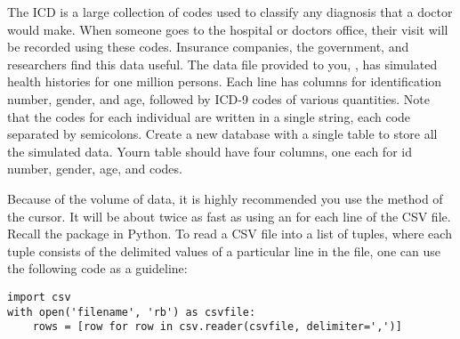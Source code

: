 \begin{problem}
The ICD is a large collection of codes used to classify any diagnosis that a doctor would make.
When someone goes to the hospital or doctors office, their visit will be recorded using these codes.
Insurance companies, the government, and researchers find this data useful.
The data file provided to you, , has simulated health histories for one million persons.
Each line has columns for identification number, gender, and age, followed by ICD-9 codes of various quantities.
Note that the codes for each individual are written in a single string, each code separated by semicolons.
Create a new database with a single table to store all the simulated data.
Yourn table should have four columns, one each for id number, gender, age, and codes.

Because of the volume of data, it is highly recommended you use the  method of the cursor.
It will be about twice as fast as using an  for each line of the CSV file.
Recall the  package in Python. To read a CSV file into a list of tuples, where each tuple consists
of the delimited values of a particular line in the file, one can use the following code as a guideline:
\begin{lstlisting}
import csv
with open('filename', 'rb') as csvfile:
    rows = [row for row in csv.reader(csvfile, delimiter=',')]
\end{lstlisting}
\label{prob:icd9tables}
\end{problem}

